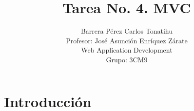 \documentclass[a4paper,12pt]{article}
\title{Tarea No. 4. MVC}
\author{Barrera Pérez Carlos Tonatihu \\ Profesor: José Asunción Enríquez Zárate 
\\ Web Application Development \\ Grupo: 3CM9 }
\begin{document}
\maketitle
\newpage
\tableofcontents

\newpage
\section{Introducción}
\end{document}
